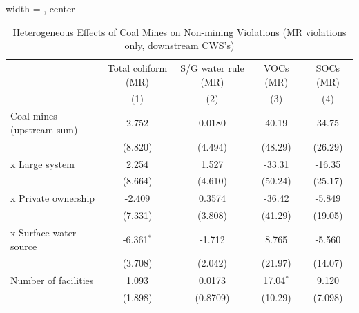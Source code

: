
\begin{table}[htbp]
   
   \caption{\label{tab:2sls_het_unified_nonminevio_ivsum_mr} Heterogeneous Effects of Coal Mines on Non-mining Violations (MR violations only, downstream CWS's)}
   \bigskip
   
   \centering
   
   \begin{adjustbox}{width = \textwidth, center}
      
      
      \begin{tabular}{lcccc}
         \toprule
         
                                                       & Total coliform (MR) & S/G water rule (MR) & VOCs (MR)     & SOCs (MR)\\  
         
                                                       & (1)                 & (2)                 & (3)           & (4)\\  
         
         \midrule 
         Coal mines (upstream sum)                     & 2.752               & 0.0180              & 40.19         & 34.75\\   
                                                       & (8.820)             & (4.494)             & (48.29)       & (26.29)\\   
           x Large system                              & 2.254               & 1.527               & -33.31        & -16.35\\   
                                                       & (8.664)             & (4.610)             & (50.24)       & (25.17)\\   
           x Private ownership                         & -2.409              & 0.3574              & -36.42        & -5.849\\   
                                                       & (7.331)             & (3.808)             & (41.29)       & (19.05)\\   
           x Surface water source                      & -6.361$^{*}$        & -1.712              & 8.765         & -5.560\\   
                                                       & (3.708)             & (2.042)             & (21.97)       & (14.07)\\   
         Number of facilities                          & 1.093               & 0.0173              & 17.04$^{*}$   & 9.120\\   
                                                       & (1.898)             & (0.8709)            & (10.29)       & (7.098)\\   
         

\end{tabular}
\end{adjustbox}
\end{table}
